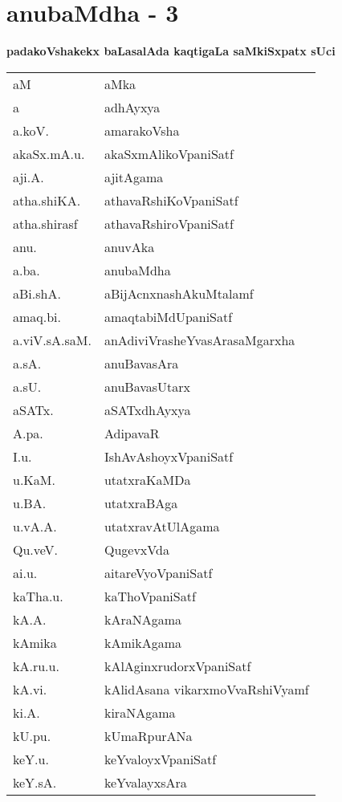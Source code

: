 \chapter*{anubaMdha - 3}

\lhead[]{}
\rhead[]{}

\begin{center}
{\Large\bf padakoVshakekx baLasalAda kaqtigaLa saMkiSxpatx sUci}
\end{center}

\begin{longtable}{ll}
aM & aMka\\
a & adhAyxya\\
a.koV. & amarakoVsha\\
akaSx.mA.u. & akaSxmAlikoVpaniSatf\\
aji.A. & ajitAgama\\
atha.shiKA. & athavaRshiKoVpaniSatf\\
atha.shirasf & athavaRshiroVpaniSatf\\
anu. & anuvAka\\
a.ba. & anubaMdha\\
aBi.shA. & aBijAcnxnashAkuMtalamf\\
amaq.bi. & amaqtabiMdUpaniSatf\\
a.viV.sA.saM. & anAdiviVrasheYvasArasaMgarxha\\
a.sA. & anuBavasAra\\
a.sU. & anuBavasUtarx\\
aSATx. & aSATxdhAyxya\\
A.pa. & AdipavaR\\
I.u. & IshAvAshoyxVpaniSatf\\
u.KaM. & utatxraKaMDa\\
u.BA. & utatxraBAga\\
u.vA.A. & utatxravAtUlAgama\\
Qu.veV. & QugevxVda\\
ai.u. & aitareVyoVpaniSatf\\
kaTha.u. & kaThoVpaniSatf\\
kA.A. & kAraNAgama\\
kAmika & kAmikAgama\\
kA.ru.u. & kAlAginxrudorxVpaniSatf\\
kA.vi. & kAlidAsana vikarxmoVvaRshiVyamf\\
ki.A. & kiraNAgama\\
kU.pu. & kUmaRpurANa\\
keY.u. & keYvaloyxVpaniSatf\\
keY.sA. & keYvalayxsAra\\

\end{longtable}
